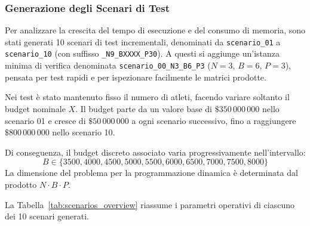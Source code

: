 \subsubsection{Generazione degli Scenari di Test}
Per analizzare la crescita del tempo di esecuzione e del consumo di memoria, sono stati generati 10 scenari di test incrementali, denominati da \texttt{scenario\_01} a \texttt{scenario\_10} (con suffisso \texttt{\_N9\_BXXXX\_P30}). A questi si aggiunge un'istanza minima di verifica denominata \texttt{scenario\_00\_N3\_B6\_P3} ($N=3$, $B=6$, $P=3$), pensata per test rapidi e per ispezionare facilmente le matrici prodotte.

Nei test è stato mantenuto fisso il numero di atleti, facendo variare soltanto il budget nominale $X$. Il budget parte da un valore base di $\$350\,000\,000$ nello scenario 01 e cresce di $\$50\,000\,000$ a ogni scenario successivo, fino a raggiungere $\$800\,000\,000$ nello scenario 10.

Di conseguenza, il budget discreto associato varia progressivamente nell'intervallo:
\begin{equation}
	B \in \{3500, 4000, 4500, 5000, 5500, 6000, 6500, 7000, 7500, 8000\}
\end{equation}
La dimensione del problema per la programmazione dinamica è determinata dal prodotto $N \cdot B \cdot P$.

La Tabella~\ref{tab:scenarios_overview} riassume i parametri operativi di ciascuno dei 10 scenari generati.

